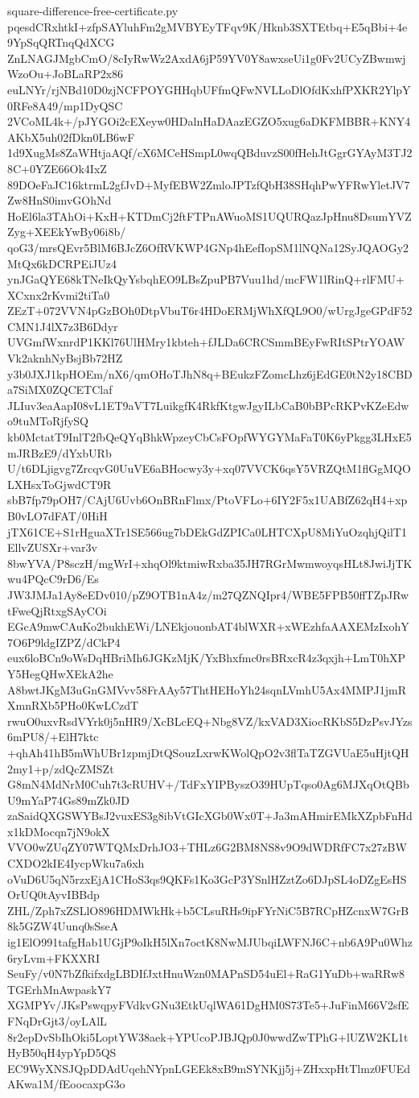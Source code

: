 \documentclass[11pt]{article}
\theoremstyle{definition}
\theoremstyle{remark}
\begin{document}
\begin{filecontents*}[overwrite]{square-difference-free-certificate.py}
pqesdCRxhtkI+zfpSAYluhFm2gMVBYEyTFqv9K/Hknb3SXTEtbq+E5qBbi+4e9YpSqQRTnqQdXCG
ZnLNAGJMgbCmO/8cIyRwWz2AxdA6jP59YV0Y8awxseUi1g0Fv2UCyZBwmwjWzoOu+JoBLaRP2x86
euLNYr/rjNBd10D0zjNCFPOYGHHqbUFfmQFwNVLLoDlOfdKxhfPXKR2YlpY0RFe8A49/mp1DyQSC
2VCoML4k+/pJYGOi2cEXeyw0HDalnHaDAazEGZO5xug6aDKFMBBR+KNY4AKbX5uh02fDkn0LB6wF
1d9XugMs8ZaWHtjaAQf/cX6MCeHSmpL0wqQBduvzS00fHehJtGgrGYAyM3TJ28C+0YZE66Ok4IxZ
89DOeFaJC16ktrmL2gfJvD+MyfEBW2ZmloJPTzfQbH38SHqhPwYFRwYletJV7Zw8HnS0imvGOhNd
HoEl6la3TAhOi+KxH+KTDmCj2ftFTPnAWuoMS1UQURQazJpHnu8DsumYVZZyg+XEEkYwBy06i8b/
qoG3/mrsQEvr5BlM6BJcZ6OfRVKWP4GNp4hEefIopSM1lNQNa12SyJQAOGy2MtQx6kDCRPEiJUz4
ynJGaQYE68kTNeIkQyYsbqhEO9LBsZpuPB7Vuu1hd/mcFW1lRinQ+rlFMU+XCxnx2rKvmi2tiTa0
ZEzT+072VVN4pGzBOh0DtpVbuT6r4HDoERMjWhXfQL9O0/wUrgJgeGPdF52CMN1J4lX7z3B6Ddyr
UVGmfWxnrdP1KKl76UlHMry1kbteh+fJLDa6CRCSmmBEyFwRItSPtrYOAWVk2aknhNyBsjBb72HZ
y3b0JXJ1kpHOEm/nX6/qmOHoTJhN8q+BEukzFZomcLhz6jEdGE0tN2y18CBDa7SiMX0ZQCETClaf
JLIuv3eaAapI08vL1ET9aVT7LuikgfK4RkfKtgwJgyILbCaB0bBPcRKPvKZeEdwo9tuMToRjfySQ
kb0MctatT9InlT2fbQeQYqBhkWpzeyCbCsFOpfWYGYMaFaT0K6yPkgg3LHxE5mJRBzE9/dYxbURb
U/t6DLjigvg7ZrcqvG0UuVE6aBHocwy3y+xq07VVCK6qsY5VRZQtM1flGgMQOLXHsxToGjwdCT9R
sbB7fp79pOH7/CAjU6Uvb6OnBRnFlmx/PtoVFLo+6IY2F5x1UABfZ62qH4+xpB0vLO7dFAT/0HiH
jTX61CE+S1rHguaXTr1SE566ug7bDEkGdZPICa0LHTCXpU8MiYuOzqhjQilT1EllvZUSXr+var3v
8bwYVA/P8sczH/mgWrI+xhqOl9ktmiwRxba35JH7RGrMwmwoyqsHLt8JwiJjTKwu4PQcC9rD6/Es
JW3JMJa1Ay8eEDv010/pZ9OTB1nA4z/m27QZNQIpr4/WBE5FPB50ffTZpJRwtFweQjRtxgSAyCOi
EGcA9mwCAuKo2bukhEWi/LNEkjouonbAT4blWXR+xWEzhfaAAXEMzIxohY7O6P9ldgIZPZ/dCkP4
eux6loBCn9oWsDqHBriMh6JGKzMjK/YxBhxfmc0rsBRxcR4z3qxjh+LmT0hXPY5HegQHwXEkA2he
A8bwtJKgM3uGnGMVvv58FrAAy57ThtHEHoYh24sqnLVmhU5Ax4MMPJ1jmRXmnRXb5PHo0KwLCzdT
rwuO0uxvRsdVYrk0j5nHR9/XcBLcEQ+Nbg8VZ/kxVAD3XiocRKbS5DzPsvJYzs6mPU8/+ElH7ktc
+qhAh41hB5mWhUBr1zpmjDtQSouzLxrwKWolQpO2v3flTaTZGVUaE5uHjtQH2my1+p/zdQcZMSZt
G8mN4MdNrM0Cuh7t3cRUHV+/TdFxYIPByszO39HUpTqso0Ag6MJXqOtQBbU9mYaP74Gs89mZk0JD
zaSaidQXGSWYBsJ2vuxES3g8ibVtGIcXGb0Wx0T+Ja3mAHmirEMkXZpbFnHdx1kDMocqn7jN9okX
VVO0wZUqZY07WTQMxDrhJO3+THLz6G2BM8NS8v9O9dWDRfFC7x27zBWCXDO2kIE4IycpWku7a6xh
oVuD6U5qN5rzxEjA1CHoS3qs9QKFs1Ko3GcP3YSnlHZztZo6DJpSL4oDZgEsHSOrUQ0tAyvIBBdp
ZHL/Zph7xZSLlO896HDMWkHk+b5CLsuRHs9ipFYrNiC5B7RCpHZcnxW7GrB8k5GZW4Uunq0sSseA
ig1ElO991tafgHab1UGjP9oIkH5lXn7octK8NwMJUbqiLWFNJ6C+nb6A9Pu0Whz6ryLvm+FKXXRI
SeuFy/v0N7bZfkifxdgLBDIfJxtHnuWzn0MAPnSD54uEl+RaG1YuDb+waRRw8TGErhMnAwpaskY7
XGMPYv/JKsPswqpyFVdkvGNu3EtkUqlWA61DgHM0S73Te5+JuFinM66V2sfEFNqDrGjt3/oyLAlL
8r2epDvSbIhOki5LoptYW38aek+YPUcoPJBJQp0J0wwdZwTPhG+lUZW2KL1tHyB50qH4ypYpD5QS
EC9WyXNSJQpDDAdUqehNYpnLGEEk8xB9mSYNKjj5j+ZHxxpHtTlmz0FUEdAKwa1M/fEoocaxpG3o

\end{filecontents*}
\end{document}
